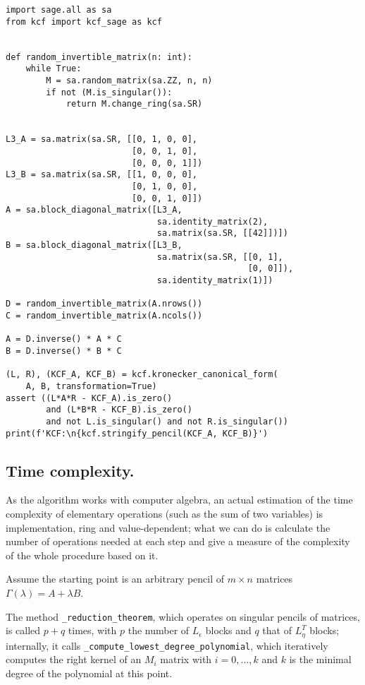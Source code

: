 \pagebreak


\begin{verbatim}
import sage.all as sa
from kcf import kcf_sage as kcf


def random_invertible_matrix(n: int):
    while True:
        M = sa.random_matrix(sa.ZZ, n, n)
        if not (M.is_singular()):
            return M.change_ring(sa.SR)


L3_A = sa.matrix(sa.SR, [[0, 1, 0, 0],
                         [0, 0, 1, 0],
                         [0, 0, 0, 1]])
L3_B = sa.matrix(sa.SR, [[1, 0, 0, 0],
                         [0, 1, 0, 0],
                         [0, 0, 1, 0]])
A = sa.block_diagonal_matrix([L3_A,
                              sa.identity_matrix(2),
                              sa.matrix(sa.SR, [[42]])])
B = sa.block_diagonal_matrix([L3_B,
                              sa.matrix(sa.SR, [[0, 1],
                                                [0, 0]]),
                              sa.identity_matrix(1)])

D = random_invertible_matrix(A.nrows())
C = random_invertible_matrix(A.ncols())

A = D.inverse() * A * C
B = D.inverse() * B * C

(L, R), (KCF_A, KCF_B) = kcf.kronecker_canonical_form(
    A, B, transformation=True)
assert ((L*A*R - KCF_A).is_zero()
        and (L*B*R - KCF_B).is_zero()
        and not L.is_singular() and not R.is_singular())
print(f'KCF:\n{kcf.stringify_pencil(KCF_A, KCF_B)}')
\end{verbatim}

\pagebreak


\subsection*{Time complexity.}
As the algorithm works with computer algebra, an actual estimation of the time complexity of elementary operations
(such as the sum of two variables) is implementation, ring and value-dependent; what we can do is calculate
the number of operations needed at each step and give a measure of the complexity of the whole procedure based on it.

Assume the starting point is an arbitrary pencil of \(m \times n\) matrices \(\Gamma(\lambda) = A+\lambda B\).

The method \texttt{_reduction_theorem}, which operates on singular pencils of matrices,
is called \(p + q\) times, with \(p\) the number of \(L_\epsilon\) blocks and \(q\)
that of \(L^T_\eta\) blocks; internally, it calls \texttt{_compute_lowest_degree_polynomial}, which
iteratively computes the right kernel of an \(M_i\) matrix with \(i = 0, ..., k\) and \(k\) is the minimal degree
of the polynomial at this point.

